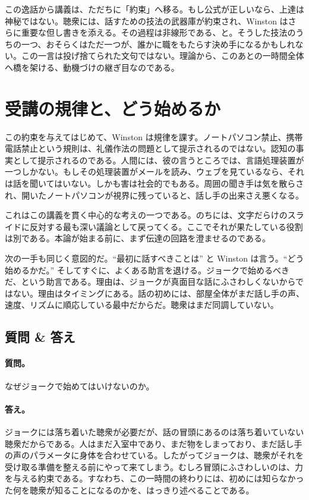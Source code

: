 この逸話から講義は、ただちに「約束」へ移る。もし公式が正しいなら、上達は神秘ではない。聴衆には、話すための技法の武器庫が約束され、Winston はさらに重要な但し書きを添える。その過程は非線形である、と。そうした技法のうちの一つ、おそらくはただ一つが、誰かに職をもたらす決め手になるかもしれない。この一言は投げ捨てられた文句ではない。理論から、このあとの一時間全体へ橋を架ける、動機づけの継ぎ目なのである。

\section{受講の規律と、どう始めるか}

この約束を与えてはじめて、Winston は規律を課す。ノートパソコン禁止、携帯電話禁止という規則は、礼儀作法の問題として提示されるのではない。認知の事実として提示されるのである。人間には、彼の言うところでは、言語処理装置が一つしかない。もしその処理装置がメールを読み、ウェブを見ているなら、それは話を聞いてはいない。しかも害は社会的でもある。周囲の聞き手は気を散らされ、開いたノートパソコンが視界に残っていると、話し手の出来さえ悪くなる。

これはこの講義を貫く中心的な考えの一つである。のちには、文字だらけのスライドに反対する最も深い議論として戻ってくる。ここでそれが果たしている役割は別である。本論が始まる前に、まず伝達の回路を澄ませるのである。

次の一手も同じく意図的だ。``最初に話すべきことは'' と Winston は言う。``どう始めるかだ。'' そしてすぐに、よくある助言を退ける。ジョークで始めるべきだ、という助言である。理由は、ジョークが真面目な話にふさわしくないからではない。理由はタイミングにある。話の初めには、部屋全体がまだ話し手の声、速度、リズムに順応している最中だからだ。聴衆はまだ同調していない。

\subsection{質問 \& 答え}

\paragraph{質問。} なぜジョークで始めてはいけないのか。

\paragraph{答え。} ジョークには落ち着いた聴衆が必要だが、話の冒頭にあるのは落ち着いていない聴衆だからである。人はまだ入室中であり、まだ物をしまっており、まだ話し手の声のパラメータに身体を合わせている。したがってジョークは、聴衆がそれを受け取る準備を整える前にやって来てしまう。むしろ冒頭にふさわしいのは、力を与える約束である。すなわち、この一時間の終わりには、初めには知らなかった何を聴衆が知ることになるのかを、はっきり述べることである。

